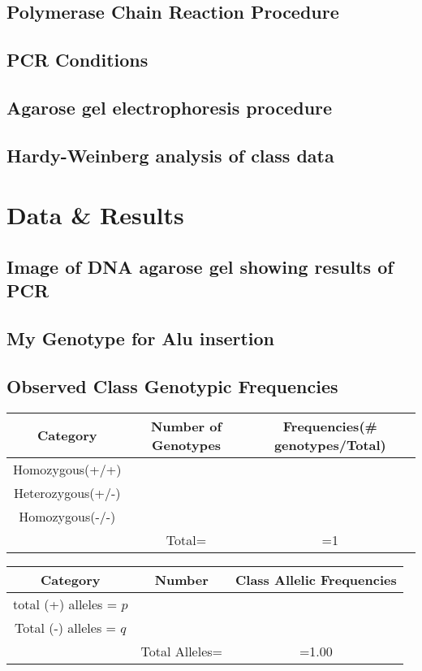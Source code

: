 \documentclass[paper=a4, fontsize=11pt]{scrartcl} %
\numberwithin{equation}{section} %
\numberwithin{figure}{section} %
\numberwithin{table}{section} %
\begin{document}
\subsection{Polymerase Chain Reaction Procedure}
\subsection{PCR Conditions}
\subsection{Agarose gel electrophoresis procedure}
\subsection{Hardy-Weinberg analysis of class data}





\section{Data \& Results}

\subsection{Image of DNA agarose gel showing results of PCR}
\subsection{My Genotype for Alu insertion}
\subsection{Observed Class Genotypic Frequencies}
\newpage
\begin{tabular}{|c|c|c|}
	
	\hline Category  & Number of Genotypes & Frequencies(\# genotypes/Total)  \\ 
	\hline  Homozygous(+/+)&  &  \\ 
	\hline  Heterozygous(+/-)&  &  \\ 
	\hline  Homozygous(-/-)&  &  \\ 
	\hline  & Total= & =1  \\ 
	\hline 
\end{tabular} 

\begin{tabular}{|c|c|c|}
	
	\hline Category  & Number & Class Allelic Frequencies  \\ 
	\hline  total (+) alleles = $p$&  &  \\ 
	\hline  Total (-) alleles = $q$ &  &  \\ 

	\hline  & Total Alleles= & =1.00  \\ 
	\hline 
\end{tabular} 
\end{document}
